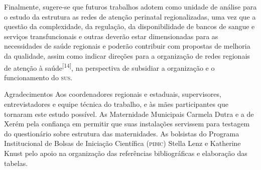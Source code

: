 \documentclass{article}
\begin{document}
Finalmente, sugere-se que futuros trabalhos adotem como unidade de análise para
o
estudo da estrutura as redes de atenção perinatal regionalizadas, uma vez que a
questão da complexidade, da regulação, da disponibilidade de bancos de sangue e
serviços transfuncionais e outras deverão estar dimensionadas para as
necessidades
de saúde regionais e poderão contribuir com propostas de melhoria da qualidade,
assim como indicar direções para a organização de redes regionais de atenção à
saúde\textsuperscript{[}\textsuperscript{14}\textsuperscript{]}, na perspectiva de
subsidiar a organização e o funcionamento do \textsc{sus}.

Agradecimentos
Aos coordenadores regionais e estaduais, supervisores, entrevistadores e equipe
técnica do trabalho, e às mães participantes que tornaram este estudo possível.
As
Maternidade Municipais Carmela Dutra e a de Xerém pela confiança em permitir que
suas instalações servissem para testagem do questionário sobre estrutura das
maternidades. As bolsistas do Programa Institucional de Bolsas de Iniciação
Científica (\textsc{pibic}) Stella Lenz e Katherine Knust pelo apoio na organização das
referências bibliográficas e elaboração das tabelas.
\end{document}
